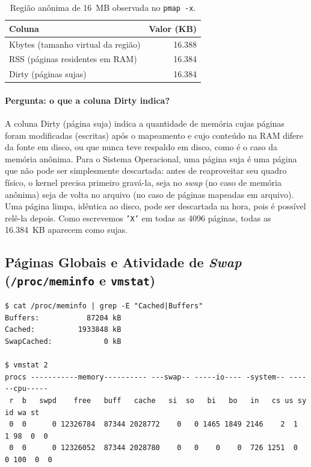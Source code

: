 \documentclass[11pt,a4paper]{article}
\begin{document}
\begin{table}[h]
\centering
\begin{tabular}{lr}
\toprule
Coluna & Valor (KB) \\
\midrule
Kbytes (tamanho virtual da região) & 16.388 \\
RSS (páginas residentes em RAM)    & 16.384 \\
Dirty (páginas sujas)              & 16.384 \\
\bottomrule
\end{tabular}
\caption{Região anônima de 16~MB observada no \texttt{pmap -x}.}
\end{table}

\paragraph{Pergunta: o que a coluna Dirty indica?}
A coluna Dirty (página suja) indica a quantidade de memória cujas páginas foram modificadas
(escritas) após o mapeamento e cujo conteúdo na RAM difere da fonte em disco, ou que nunca teve
respaldo em disco, como é o caso da memória anônima. Para o Sistema Operacional, uma página suja é
uma página que não pode ser simplesmente descartada: antes de reaproveitar seu quadro físico, o
kernel precisa primeiro gravá-la, seja no \emph{swap} (no caso de memória anônima) seja de volta no
arquivo (no caso de páginas mapeadas em arquivo). Uma página limpa, idêntica ao disco, pode ser
descartada na hora, pois é possível relê-la depois. Como escrevemos \texttt{'X'} em todas as 4096
páginas, todas as 16.384~KB aparecem como sujas.

\subsection{Páginas Globais e Atividade de \emph{Swap} (\texttt{/proc/meminfo} e \texttt{vmstat})}

\begin{lstlisting}[style=bashstyle]
$ cat /proc/meminfo | grep -E "Cached|Buffers"
Buffers:           87204 kB
Cached:          1933848 kB
SwapCached:            0 kB

$ vmstat 2
procs -----------memory---------- ---swap-- -----io---- -system-- ------cpu-----
 r  b   swpd    free   buff   cache   si  so   bi   bo   in   cs us sy id wa st
 0  0      0 12326784  87344 2028772    0   0 1465 1849 2146    2  1  1 98  0  0
 0  0      0 12326052  87344 2028780    0   0    0    0  726 1251  0  0 100  0  0
\end{lstlisting}
\end{document}
